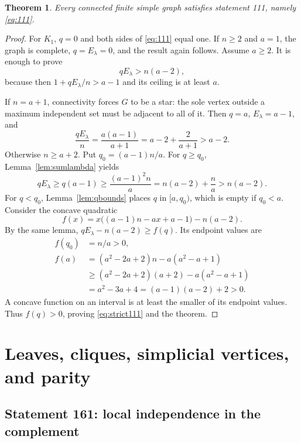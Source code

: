 \documentclass[11pt,a4paper]{article}
\newtheorem{theorem}{Theorem}[section]
\theoremstyle{remark}
\begin{document}
\begin{theorem}\label{thm:111}
Every connected finite simple graph satisfies statement 111,
namely \eqref{eq:111}.
\end{theorem}
\begin{proof}
For $K_1$, $q=0$ and both sides of \eqref{eq:111} equal one.
If $n\ge2$ and $a=1$, the graph is complete, $q=E_\lambda=0$, and
the result again follows. Assume $a\ge2$. It is enough to prove
\begin{equation}\label{eq:strict111}
qE_\lambda>n(a-2),
\end{equation}
because then $1+qE_\lambda/n>a-1$ and its ceiling is at least $a$.

If $n=a+1$, connectivity forces $G$ to be a star: the sole vertex outside
a maximum independent set must be adjacent to all of it. Then
$q=a$, $E_\lambda=a-1$, and
\[
\frac{qE_\lambda}{n}=\frac{a(a-1)}{a+1}
=a-2+\frac{2}{a+1}>a-2.
\]
Otherwise $n\ge a+2$. Put $q_0=(a-1)n/a$.
For $q\ge q_0$, Lemma~\ref{lem:sumlambda} yields
\[
qE_\lambda\ge q(a-1)\ge\frac{(a-1)^2n}{a}
=n(a-2)+\frac{n}{a}>n(a-2).
\]
For $q<q_0$, Lemma~\ref{lem:qbounds} places $q$ in $[a,q_0)$, which
is empty if $q_0<a$. Consider the concave quadratic
\[
f(x)=x\bigl((a-1)n-ax+a-1\bigr)-n(a-2).
\]
By the same lemma, $qE_\lambda-n(a-2)\ge f(q)$. Its endpoint values are
\begin{align*}
f(q_0)&=n/a>0,\\
f(a)&=(a^2-2a+2)n-a(a^2-a+1)\\
&\ge(a^2-2a+2)(a+2)-a(a^2-a+1)\\
&=a^2-3a+4=(a-1)(a-2)+2>0.
\end{align*}
A concave function on an interval is at least the smaller of its endpoint
values. Thus $f(q)>0$, proving \eqref{eq:strict111} and the theorem.
\end{proof}

\section{Leaves, cliques, simplicial vertices, and parity}\label{sec:leaves}

\subsection{Statement 161: local independence in the complement}
\end{document}
